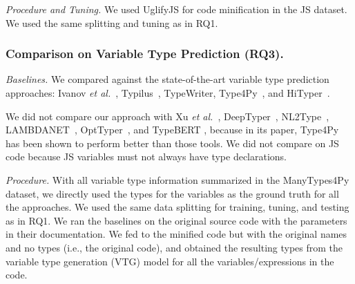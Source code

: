 
\textit{Procedure and Tuning.} We used UglifyJS for code minification
in the JS dataset. We used the same splitting and tuning as in RQ1.




\subsubsection{Comparison on Variable Type Prediction (RQ3).\\}

{\em Baselines.} We compared {\tool} against the state-of-the-art
  variable type prediction approaches: Ivanov {\em et
  al.}~\cite{ivanov21predicting}, Typilus~\cite{typilus-pldi20},
  TypeWriter\cite{typewriter-fse20}, Type4Py~\cite{Type4Py-icse22},
  and HiTyper~\cite{HiTyper-icse22}.


We did not compare our approach with Xu {\em et al.}~\cite{xu-fse16},
DeepTyper~\cite{DeepTyper-fse18}, NL2Type~\cite{nl2type-icse19},
LAMBDANET~\cite{LambdaNet-iclr20}, OptTyper~\cite{optyper20}, and
TypeBERT \cite{typeBERT-fse21}, because in its paper, Type4Py has been
shown to perform better than those tools.
We did not compare on JS code because JS variables must not always
have type declarations.


\textit{Procedure.}  With all variable type information summarized in
the ManyTypes4Py dataset, we directly used the types for
the variables as the ground truth for all the approaches. We used the
same data splitting for training, tuning, and testing as in RQ1. We
ran the baselines on the original source code with the parameters in
their documentation. We fed to {\tool} the minified code but with the
original names and no types (i.e., the original code), and obtained
the resulting types from the variable type generation (VTG) model for all the
variables/expressions in the code.

